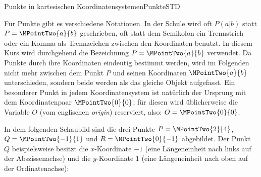 \begin{MXContent}{Punkte in kartesischen Koordinatensystemen}{Punkte}{STD}
\begin{MInfo}
\begin{center}
{
}
\end{center}

\end{MInfo}

Für Punkte gibt es verschiedene Notationen. In der Schule wird oft $P(a|b)$ statt $P=\MPointTwo{a}{b}$ geschrieben, oft statt dem Semikolon ein Trennstrich oder ein Komma als Trennzeichen zwischen den Koordinaten benutzt. In diesem Kurs wird durchgehend die Bezeichnung $P=\MPointTwo{a}{b}$ verwendet. Da Punkte durch ihre Koordinaten eindeutig bestimmt werden, wird im Folgenden nicht mehr zwischen dem Punkt $P$ und seinen Koordinaten $\MPointTwo{a}{b}$ unterschieden, sondern beide werden als das gleiche Objekt aufgefasst. Ein besonderer Punkt in jedem Koordinatensystem ist natürlich der Ursprung mit dem Koordinatenpaar $\MPointTwo{0}{0}$; für diesen wird üblicherweise die Variable $O$ (vom englischen \textit{origin}) reserviert, also: $O=\MPointTwo{0}{0}$.

\begin{MExample}
In dem folgenden Schaubild sind die drei Punkte $P=\MPointTwo{2}{4}$, $Q=\MPointTwo{-1}{1}$ und $R=\MPointTwo{0}{-1}$ abgebildet.
Der Punkt $Q$ beispielsweise besitzt die $x$-Koordinate $-1$ (eine Längeneinheit nach links auf der Abszissenachse) und die $y$-Koordinate $1$ (eine Längeneinheit nach oben auf der Ordinatenachse):
\begin{center}
\end{center}
\end{MExample}
\end{MXContent}

